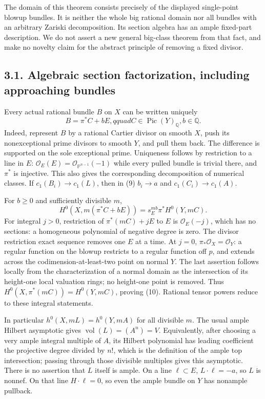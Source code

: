 \documentclass[
  10pt,
]{article}
\begin{document}
The domain of this theorem consists precisely of the displayed
single-point blowup bundles. It is neither the whole big rational domain
nor all bundles with an arbitrary Zariski decomposition. Its section
algebra has an ample fixed-part description. We do not assert a new
general big-class theorem from that fact, and make no novelty claim for
the abstract principle of removing a fixed divisor.

\subsection{3.1. Algebraic section factorization, including approaching
bundles}\label{algebraic-section-factorization-including-approaching-bundles}

Every actual rational bundle \(B\) on \(X\) can be written uniquely
\[ B=\pi^*C+bE,qquad C\in\operatorname{Pic}(Y)_\mathbb Q, b\in\mathbb Q. \tag{9} \]
Indeed, represent \(B\) by a rational Cartier divisor on smooth \(X\),
push its nonexceptional prime divisors to smooth \(Y\), and pull them
back. The difference is supported on the sole exceptional prime.
Uniqueness follows by restriction to a line in \(E\):
\(\mathcal O_E(E)=\mathcal O_{\mathbb P^{n-1}}(-1)\) while every pulled
bundle is trivial there, and \(\pi^*\) is injective. This also gives the
corresponding decomposition of numerical classes. If
\(c_1(B_i)\to c_1(L)\), then in (9) \(b_i\to a\) and
\(c_1(C_i)\to c_1(A)\).

For \(b\ge0\) and sufficiently divisible \(m\), \[
 H^0(X,m(\pi^*C+bE))
       =s_E^{mb}\pi^*H^0(Y,mC).
 \tag{10}
\] For integral \(j>0\), restriction of \(\pi^*(mC)+jE\) to \(E\) is
\(\mathcal O_E(-j)\), which has no sections: a homogeneous polynomial of
negative degree is zero. The divisor restriction exact sequence removes
one \(E\) at a time. At \(j=0\), \(\pi_*\mathcal O_X=\mathcal O_Y\): a
regular function on the blowup restricts to a regular function off
\(p\), and extends across the codimension-at-least-two point on normal
\(Y\). The last assertion follows locally from the characterization of a
normal domain as the intersection of its height-one local valuation
rings; no height-one point is removed. Thus
\(H^0(X,\pi^*(mC))=H^0(Y,mC)\), proving (10). Rational tensor powers
reduce to these integral statements.

In particular \(h^0(X,mL)=h^0(Y,mA)\) for all divisible \(m\). The usual
ample Hilbert asymptotic gives \(\operatorname{vol}(L)=(A^n)=V\).
Equivalently, after choosing a very ample integral multiple of \(A\),
its Hilbert polynomial has leading coefficient the projective degree
divided by \(n!\), which is the definition of the ample top
intersection; passing through those divisible multiples gives this
asymptotic. There is no assertion that \(L\) itself is ample. On a line
\(\ell\subset E\), \(L\cdot\ell=-a\), so \(L\) is nonnef. On that line
\(H\cdot\ell=0\), so even the ample bundle on \(Y\) has nonample
pullback.
\end{document}
